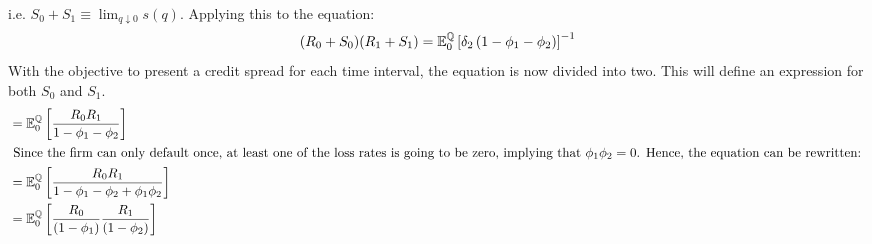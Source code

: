 \documentclass[main.tex]{subfiles}
\begin{document}
        i.e. $S_0 + S_1 \equiv \lim_{q \downarrow 0} s(q)$.
        Applying this to the equation:
        \begin{equation}
            (R_{0} + S_{0})(R_{1} + S_{1}) =
            \mathbb{E}_{0}^{\mathbb{Q}}\left[
                \delta_2\left(
                1
                - \phi_1
                - \phi_2
                \right)
            \right]^{-1}
            \label{eqn:aggregate-credit-spread-multi-period}
        \end{equation}
        With the objective to present a credit spread for each time interval, the equation is now divided into two.
        This will define an expression for both $S_0$ and $S_1$.
        \\
        \begin{align}
            & = 
            \mathbb{E}_{0}^{\mathbb{Q}}\left[
                \frac{
                    R_{0}R_{1}
                }{
                    1
                    - 
                    \phi_1
                    - 
                    \phi_2
                } 
            \right] \\
        \intertext{
            Since the firm can only default once, at least one of the loss rates is going to be zero,
            implying that $\phi_{1}\phi_{2} = 0$.
            Hence, the equation can be rewritten:
        }
            & = 
            \mathbb{E}_{0}^{\mathbb{Q}}\left[
                \frac{
                    R_{0}R_{1}
                }{
                    1
                    - 
                    \phi_1
                    - 
                    \phi_2
                    +
                    \phi_1
                    \phi_2
                } 
            \right] \\
            & = 
            \mathbb{E}_{0}^{\mathbb{Q}}\left[
                \frac{
                    R_{0}
                }{
                    (1 - \phi_{1})
                } 
                \frac{
                    R_{1}
                }{
                    (1 - \phi_{2})
                } 
            \right] 
        \end{align}
\end{document}
